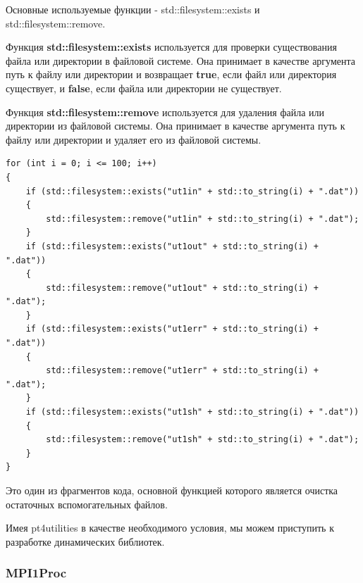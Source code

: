 Основные используемые функции - std::filesystem::exists и std::filesystem::remove.

Функция \textbf{std::filesystem::exists} используется для проверки существования файла или директории в 
файловой системе. Она принимает в качестве аргумента путь к файлу или директории и возвращает 
\textbf{true}, если файл или директория существует, и \textbf{false}, если файла или директории не существует.

Функция \textbf{std::filesystem::remove} используется для удаления файла или директории из файловой системы. 
Она принимает в качестве аргумента путь к файлу или директории и удаляет его из файловой системы.

\lstset{language=c++}
\begin{lstlisting}
for (int i = 0; i <= 100; i++)
{
    if (std::filesystem::exists("ut1in" + std::to_string(i) + ".dat"))
    {
        std::filesystem::remove("ut1in" + std::to_string(i) + ".dat");
    }
    if (std::filesystem::exists("ut1out" + std::to_string(i) + ".dat"))
    {
        std::filesystem::remove("ut1out" + std::to_string(i) + ".dat");
    }
    if (std::filesystem::exists("ut1err" + std::to_string(i) + ".dat"))
    {
        std::filesystem::remove("ut1err" + std::to_string(i) + ".dat");
    }
    if (std::filesystem::exists("ut1sh" + std::to_string(i) + ".dat"))
    {
        std::filesystem::remove("ut1sh" + std::to_string(i) + ".dat");
    }
}
\end{lstlisting}

Это один из фрагментов кода, основной функцией которого является очистка остаточных вспомогательных файлов.

Имея pt4utilities в качестве необходимого условия, мы можем приступить к разработке динамических библиотек.

\subsubsection{MPI1Proc}

